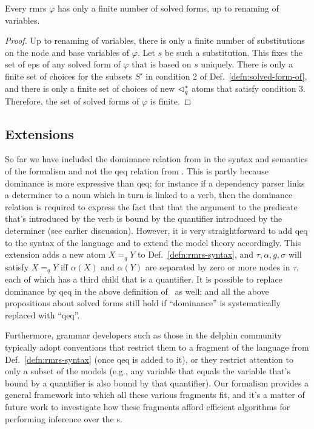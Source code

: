 \begin{prop}  \label{prop:finite-solved-forms}
  Every {\sc rmrs} $\varphi$ has only a finite number of solved forms, up to
  renaming of variables.
\end{prop}
\begin{proof}
  Up to renaming of variables, there is only a finite number of
  substitutions on the node and base variables of $\varphi$.  Let $s$
  be such a substitution.  This fixes the set of {\sc ep}s of any solved
  form of $\varphi$ that is based on $s$ uniquely.  There is only a
  finite set of choices for the subsets $S'$ in condition 2 of
  Def.~\ref{defn:solved-form-of}, and there is only a finite set of
  choices of new $\lhd^*_q$ atoms that satisfy condition 3.  Therefore,
  the set of solved forms of $\varphi$ is finite.
\end{proof}




\subsection{Extensions}
\label{sec:extensions}

So far we have included the dominance relation from
\cite{egg:etal:2001} in the syntax and semantics of the formalism and
not the qeq relation from \cite{copestake:etal:2005}.  This is partly
because dominance is more expressive than qeq; for instance if a
dependency parser links a determiner to a noun which in turn is
linked to a verb, then the dominance relation is required to express
the fact that
that the argument to the predicate that's introduced by the verb is bound by
the quantifier introduced by 
the determiner (see earlier discussion).  However, it is very
straightforward to add qeq to the syntax of the language and to extend
the model theory accordingly.  This extension adds a new atom $X=_q Y$
to Def.~\ref{defn:rmrs-syntax}, and $\tau,\alpha,g,\sigma$ will
satisfy $X=_q Y$ iff $\alpha(X)$ and $\alpha(Y)$ are separated by
zero or more nodes in $\tau$, each of which has a third child that is a
quantifier.  It is possible to replace dominance by qeq in the above
definition of \rmrs\ as well; and all the above propositions about
solved forms still hold if ``dominance'' is systematically replaced
with ``qeq''.

Furthermore, grammar developers such as those in the {\sc delphin}
community typically adopt conventions that restrict them to a
fragment of the language from Def.~\ref{defn:rmrs-syntax} (once
qeq is added to it), or they restrict attention to only a subset of
the models (e.g., any variable that equals the variable
that's bound by a quantifier is also bound by that quantifier). 
Our formalism provides a general framework
into which all these various fragments fit, and it's a matter of
future work to investigate how these fragments afford efficient
algorithms for performing inference over the \rmrs s.

